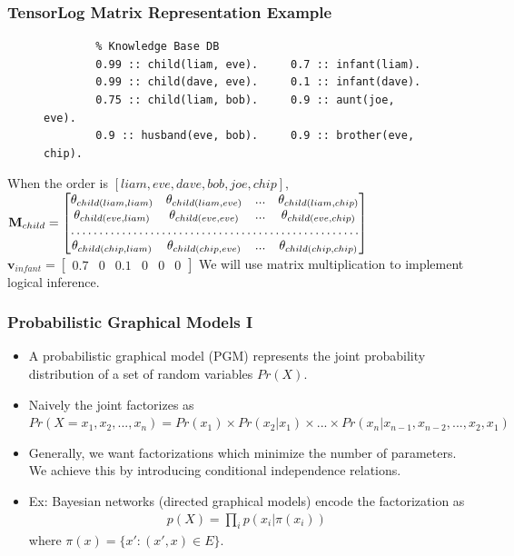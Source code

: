 \documentclass{beamer}
\begin{document}
\begin{frame}[fragile]
\frametitle{TensorLog Matrix Representation Example}
\begin{figure}
	\begin{center}
		\begin{verbatim}
		% Knowledge Base DB
		0.99 :: child(liam, eve).     0.7 :: infant(liam).
		0.99 :: child(dave, eve).     0.1 :: infant(dave).
		0.75 :: child(liam, bob).     0.9 :: aunt(joe, eve).
		0.9 :: husband(eve, bob).     0.9 :: brother(eve, chip).
		\end{verbatim}
	\end{center}
\end{figure}
When the order is $[liam, eve, dave, bob, joe, chip]$, 
$\textbf{M}_{child}
= 
\begin{bmatrix}
\theta_{child(liam, liam)} & \theta_{child(liam, eve)}  & ...  & \theta_{child(liam, chip)} \\
\theta_{child(eve, liam)} & \theta_{child(eve, eve)}  & ... & \theta_{child(eve, chip)} \\
\hdotsfor{4} \\

\theta_{child(chip, liam)} & \theta_{child(chip, eve)}  & ... & \theta_{child(chip, chip)} \\
\end{bmatrix} $
\linebreak \linebreak
$\textbf{v}_{infant}
= 
\begin{bmatrix}
0.7 & 0 & 0.1 &0&0&0
\end{bmatrix} $
\newline\newline
We will use matrix multiplication to implement logical inference.
\end{frame}

\begin{frame}
\frametitle{Probabilistic Graphical Models I}
\begin{itemize}
	\item A probabilistic graphical model (PGM) represents the joint probability distribution of a set of random variables $Pr(X)$.
	\item Naively the joint factorizes as $Pr(X = x_1, x_2, ..., x_n) =  Pr(x_1) \times Pr(x_2 | x_1) \times ... \times Pr(x_n | x_{n-1}, x_{n -2 }, ..., x_2, x_1)$
	\item Generally, we want factorizations which minimize the number of parameters.  We achieve this by introducing conditional independence relations.
	\item Ex: Bayesian networks (directed graphical models) encode the factorization as \begin{gather*}
	p(X) = \prod_{i} p(x_i | \pi(x_i))
	\end{gather*}
	where $\pi(x) = \{ x' : (x', x) \in E \}$.
\end{itemize}
\end{frame}
\end{document}
